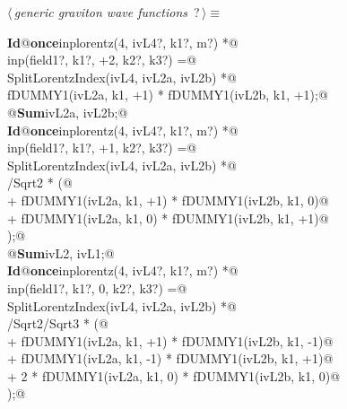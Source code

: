 \documentclass[a4paper,12pt]{amsart}
\renewcommand{\NWtarget}[2]{\hypertarget{#1}{#2}}
\begin{document}
\begin{flushleft} \small\label{scrap40}\raggedright\small
\NWtarget{nuweb?}{} $\langle\,${\it generic graviton wave functions}\nobreak\ {\footnotesize {?}}$\,\rangle\equiv$
\vspace{-1ex}
\begin{list}{}{} \item
\mbox{}\verb@@\hbox{\sffamily\bfseries Id}\verb@ @\hbox{\sffamily\bfseries once}\verb@ inplorentz(4, ivL4?, k1?, m?) *@\\
\mbox{}\verb@      inp(field1?, k1?, +2, k2?, k3?) =@\\
\mbox{}\verb@   SplitLorentzIndex(ivL4, ivL2a, ivL2b) *@\\
\mbox{}\verb@   fDUMMY1(ivL2a, k1, +1) * fDUMMY1(ivL2b, k1, +1);@\\
\mbox{}\verb@   @\hbox{\sffamily\bfseries Sum}\verb@ ivL2a, ivL2b;@\\
\mbox{}\verb@@\hbox{\sffamily\bfseries Id}\verb@ @\hbox{\sffamily\bfseries once}\verb@ inplorentz(4, ivL4?, k1?, m?) *@\\
\mbox{}\verb@      inp(field1?, k1?, +1, k2?, k3?) =@\\
\mbox{}\verb@   SplitLorentzIndex(ivL4, ivL2a, ivL2b) *@\\
\mbox{}/Sqrt2 * (@\\
\mbox{}\verb@      + fDUMMY1(ivL2a, k1, +1) * fDUMMY1(ivL2b, k1,  0)@\\
\mbox{}\verb@      + fDUMMY1(ivL2a, k1,  0) * fDUMMY1(ivL2b, k1, +1)@\\
\mbox{}\verb@   );@\\
\mbox{}\verb@   @\hbox{\sffamily\bfseries Sum}\verb@ ivL2, ivL1;@\\
\mbox{}\verb@@\hbox{\sffamily\bfseries Id}\verb@ @\hbox{\sffamily\bfseries once}\verb@ inplorentz(4, ivL4?, k1?, m?) *@\\
\mbox{}\verb@      inp(field1?, k1?,  0, k2?, k3?) =@\\
\mbox{}\verb@   SplitLorentzIndex(ivL4, ivL2a, ivL2b) *@\\
\mbox{}/Sqrt2/Sqrt3 * (@\\
\mbox{}\verb@      + fDUMMY1(ivL2a, k1, +1) * fDUMMY1(ivL2b, k1, -1)@\\
\mbox{}\verb@      + fDUMMY1(ivL2a, k1, -1) * fDUMMY1(ivL2b, k1, +1)@\\
\mbox{}\verb@      + 2 * fDUMMY1(ivL2a, k1, 0) * fDUMMY1(ivL2b, k1, 0)@\\
\mbox{}\verb@   );@\\

\end{list}
\end{flushleft}
\end{document}
